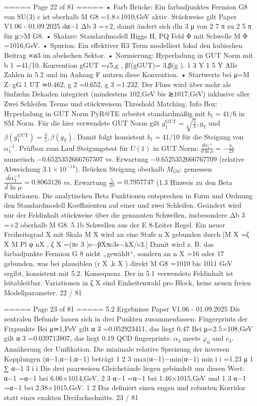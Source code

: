 \begin{MyVerbatim}
===== Page 22 of 81 =====
• Farb Brücke: Ein farbadjunktes Fermion G8 von SU(3) c ist oberhalb M G8 =1.8×1010,GeV aktiv. Stückweise gilt
Paper V1.06 - 01.09.2025
dα−1
Δb 3 =+2, damit ändert sich dln 3 μ von 2 7 π zu 2 5 π für μ>M G8.
• Skalare: Standardmodell Higgs H, PQ Feld Φ mit Schwelle M Φ =1016,GeV.
• Spurion: Ein effektiver R3 Term modelliert lokal den kubischen Beitrag ∝α3 im abelschen Sektor.
• Normierung: Hyperladung in GUT Norm mit b 1 =41/10. Konvention
gGUT =√5,g , β!(gGUT)= 3,β(g ).
1 3 Y 1 5 Y
Alle Zahlen in 5.2 und im Anhang F nutzen diese Konvention.
• Startwerte bei μ=M Z:
gG
1
UT ≃0.462, g
2
=0.652, g
3
=1.232.
Der Fluss wird über mehr als fünfzehn Dekaden integriert (mindestens 102,GeV bis ≳1017,GeV) inklusive aller Zwei
Schleifen Terme und stückweisem Threshold Matching.
Info Box: Hyperladung in GUT Norm
PyR@TE arbeitet standardmäßig mit $b_{1}=41/6$ in SM Norm. Für die hier verwendete GUT Norm gilt
$g_{1}^{\mathrm{GUT}}=\sqrt{\tfrac{5}{3}},g_{Y}$ und $\beta(g_{1}^{\mathrm{GUT}})=\tfrac{3}
{5},\beta(g_{Y})$.
Damit folgt konsistent $b_{1}=41/10$ für die Steigung von $\alpha_{1}^{-1}$.
Prüfbox zum Lauf
Steigungstest für $U(1)$ in GUT Norm:
$\frac{d\alpha_{1}^{-1}}{d\ln\mu}=-\frac{b_{1}}{2\pi}$
numerisch $-0.6525352666767507$ vs. Erwartung $-0.6525352666767709$ (relative Abweichung
$3.1\times 10^{-14}$).
Brücken Steigung oberhalb $M_{G8}$: gemessen $\dfrac{d\alpha_{3}^{-1}}{d\ln\mu}=0.8063126$ vs.
Erwartung $\tfrac{5}{2\pi}=0.7957747$ (1.3%
Hinweis zu den Beta Funktionen.
Die analytischen Beta Funktionen entsprechen in Form und Ordnung den Standardmodell Koeffizienten auf einer und
zwei Schleifen. Geändert wird nur der Feldinhalt stückweise über die genannten Schwellen, insbesondere Δb 3 =+2
oberhalb M G8.
5.1b Schwellen aus der E 8-Leiter
Regel. Ein neuer Freiheitsgrad X mit Skala M X wird an eine Stufe n X gebunden durch
[M
X
=ζ
X
M
Pl
φ
nX
, ζ
X
=(πc
3
)e−βXπc3e−kX/c3.]
Damit wird z. B. das farbadjunkte Fermion G 8 nicht „gewählt“, sondern an n X =16 oder 17 gebunden, was bei plausiblen
(r X ,k X ) direkt M G8 ∼1010 bis 1011 GeV ergibt, konsistent mit 5.2.
Konsequenz. Der in 5.1 verwendete Feldinhalt ist leitableitbar. Variationen in ζ X sind Einheitenwahl pro Block, keine
neuen freien Modellparameter.
22 / 81

===== Page 23 of 81 =====
5.2 Ergebnisse
Paper V1.06 - 01.09.2025
Die zentralen Befunde lassen sich in drei Punkten zusammenfassen:
Fingerprints der Fixpunkte
Bei μ≃1,PeV gilt
α 3 =0.052923411, das liegt 0.47%
Bei
μ=2.5×108,GeV
gilt
α 3 =0.039713807, das liegt 0.19%
QCD fingerprints: $\alpha_3$ meets $\varphi_{0}$ and $c_{3}$.
Annäherung der Unifikation.
Die minimale relative Spreizung der inversen Kopplungen
(α−1,α−1,α−1) beträgt
1 2 3
max(α−1)−min(α−1)
min i i =1.23
μ 1 ∑ α−1
3 i i
Die drei paarweisen Gleichstände liegen gebündelt um diesen Wert:
α−1 =α−1 bei 6.06×1014,GeV,
2 3
α−1 =α−1 bei 1.46×1015,GeV und
1 3
α−1 =α−1 bei 2.38×1015,GeV.
1 2
Das definiert einen engen und robusten Korridor statt eines exakten Dreifachschnitts.
23 / 81


\end{MyVerbatim}
